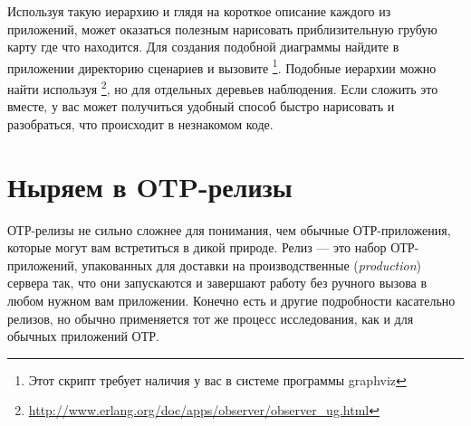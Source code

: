 \documentclass[11pt, oneside]{book}   	%
\begin{document}
Используя такую иерархию и глядя на короткое описание каждого из приложений, может оказаться полезным нарисовать приблизительную грубую карту где что находится. Для создания подобной диаграммы найдите в приложении  директорию сценариев  и вызовите \footnote{Этот скрипт требует наличия у вас в системе программы graphviz}. Подобные иерархии можно найти используя \footnote{\href{http://www.erlang.org/doc/apps/observer/observer\_ug.html}{http://www.erlang.org/doc/apps/observer/observer\_ug.html}}, но для отдельных деревьев наблюдения. Если сложить это вместе, у вас может получиться удобный способ быстро нарисовать и разобраться, что происходит в незнакомом коде.


\FloatBarrier

\section{Ныряем в OTP-релизы}
\label{sec:dive-otp-releases}

ОТР-релизы не сильно сложнее для понимания, чем обычные ОТР-приложения, которые могут вам встретиться в дикой природе. Релиз --- это набор ОТР-приложений, упакованных для доставки на производственные (\emph{production}) сервера так, что они запускаются и завершают работу без ручного вызова  в любом нужном вам приложении. Конечно есть и другие подробности касательно релизов, но обычно применяется тот же процесс исследования, как и для обычных приложений ОТР.
\end{document}
